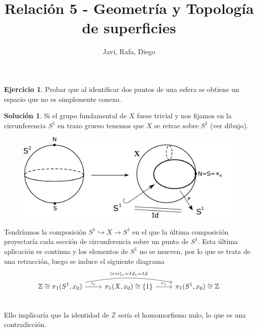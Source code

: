 \documentclass{article}
\theoremstyle{plain}
\theoremstyle{definition}
\newtheorem{exercise}{Ejercicio}
\newtheorem*{sol*}{Solución}
\newcommand{\Z}{\mathbb{Z}}
\begin{document}
\title{Relación 5 - Geometría y Topología de superficies }
\author{Javi, Rafa, Diego}
\maketitle

%

\begin{exercise} Probar que al identificar dos puntos de una esfera se obtiene un espacio que no es simplemente conexo.
\end{exercise}
\begin{sol*}Si el grupo fundamental de $X$ fuese trivial y nos fijamos en la circunferencia $S^1$ en trazo grueso tenemos que $X$ se retrae sobre $S^1$ (ver dibujo).
\begin{center}
\begin{figure}[h!]
	\includegraphics[scale=0.3]{bitmap}
\end{figure}
\end{center}
Tendríamos la composición $S^1\hookrightarrow X\to S^1$ en el que la última composición proyectaría cada sección de circunferencia sobre un punto de $S^1$. Esta última aplicación es continua y los elementos de $S^1$ no se mueven, por lo que se trata de una retracción, luego se induce el siguiente diagrama 
\[
\begin{tikzcd}
\Z\cong\pi_1(S^1,x_0)\arrow[r,"i_* "] \arrow[rr,"(r\circ i)_*=Id_*=Id",bend left=10] &  \pi_1(X,x_0)\cong\{1\}\ar[r, "r_* "] & \pi_1(S^1,x_0)\cong\Z\\
\end{tikzcd}
\]
Ello implicaría que la identidad de $\Z$ sería el homomorfismo nulo, lo que es una contradicción. 
\end{sol*}
\end{document}
